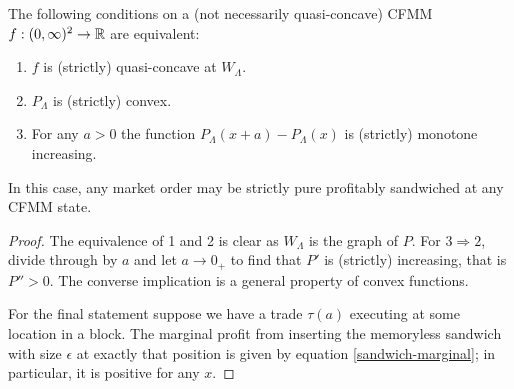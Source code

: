 \documentclass[a4paper,11pt]{article}
\begin{document}
\begin{proposition}
  The following conditions on a (not necessarily quasi-concave) CFMM $f:(0,\infty)^2\rightarrow\mathbb R$ are equivalent:
  \begin{enumerate}
    \item $f$ is (strictly) quasi-concave at $W_\Lambda$.
    \item $P_\Lambda$ is (strictly) convex.
    \item For any $a>0$ the function $P_\Lambda(x+a)-P_\Lambda(x)$ is (strictly) monotone increasing.
  \end{enumerate}
  In this case, any market order may be strictly pure profitably sandwiched at any CFMM state.
\end{proposition}
%
\begin{proof}

  The equivalence of 1 and 2 is clear as $W_\Lambda$ is the graph of $P$. For $3\Rightarrow 2$, divide through by $a$ and let $a\rightarrow 0_+$ to find that $P'$ is (strictly) increasing, that is $P''>0$. The converse implication is a general property of convex functions.
  
  For the final statement suppose we have a trade $\tau(a)$ executing at some location in a block. The marginal profit from inserting the memoryless sandwich with size $\epsilon$ at exactly that position is given by equation \eqref{sandwich-marginal}; in particular, it is positive for any $x$. \qedhere
  
\end{proof}
\end{document}
